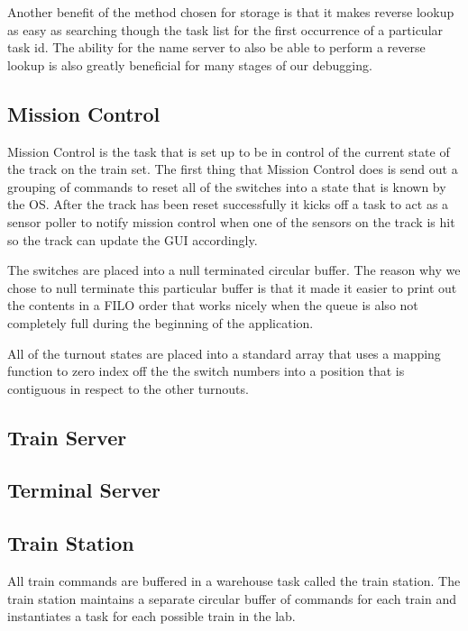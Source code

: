 \documentclass[pdftex,10pt,a4paper]{article}
\begin{document}
Another benefit of the method chosen for storage is that it makes reverse
lookup as easy as searching though the task list for the first occurrence
of a particular task id. The ability for the name server to also be able to
perform a reverse lookup is also greatly beneficial for many stages of our
debugging.

\subsection*{Mission Control}

Mission Control is the task that is set up to be in control of the current
state of the track on the train set. The first thing that Mission Control
does is send out a grouping of commands to reset all of the switches into a
state that is known by the OS. After the track has been reset successfully
it kicks off a task to act as a sensor poller to notify mission control when
one of the sensors on the track is hit so the track can update the GUI
accordingly.

The switches are placed into a null terminated circular buffer. The reason why
we chose to null terminate this particular buffer is that it made it easier to
print out the contents in a FILO order that works nicely when the queue is
also not completely full during the beginning of the application.

All of the turnout states are placed into a standard array that uses a mapping
function to zero index off the the switch numbers into a position that is
contiguous in respect to the other turnouts.

\subsection*{Train Server}

\subsection*{Terminal Server}

\subsection*{Train Station}

All train commands are buffered in a warehouse task called the train
station. The train station maintains a separate circular buffer of
commands for each train and instantiates a  task for each
possible train in the lab.
\end{document}
